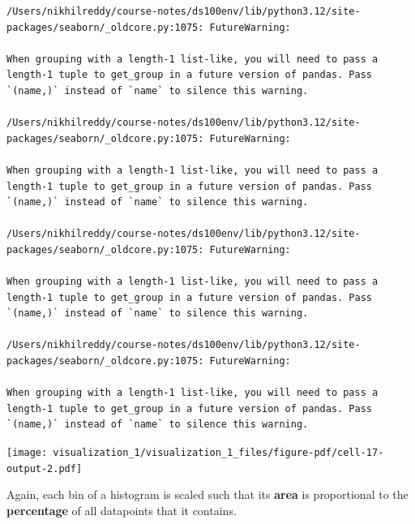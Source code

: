 \documentclass[
  letterpaper,
  DIV=11,
  numbers=noendperiod]{scrreprt}
\begin{document}
\begin{verbatim}
/Users/nikhilreddy/course-notes/ds100env/lib/python3.12/site-packages/seaborn/_oldcore.py:1075: FutureWarning:

When grouping with a length-1 list-like, you will need to pass a length-1 tuple to get_group in a future version of pandas. Pass `(name,)` instead of `name` to silence this warning.

/Users/nikhilreddy/course-notes/ds100env/lib/python3.12/site-packages/seaborn/_oldcore.py:1075: FutureWarning:

When grouping with a length-1 list-like, you will need to pass a length-1 tuple to get_group in a future version of pandas. Pass `(name,)` instead of `name` to silence this warning.

/Users/nikhilreddy/course-notes/ds100env/lib/python3.12/site-packages/seaborn/_oldcore.py:1075: FutureWarning:

When grouping with a length-1 list-like, you will need to pass a length-1 tuple to get_group in a future version of pandas. Pass `(name,)` instead of `name` to silence this warning.

/Users/nikhilreddy/course-notes/ds100env/lib/python3.12/site-packages/seaborn/_oldcore.py:1075: FutureWarning:

When grouping with a length-1 list-like, you will need to pass a length-1 tuple to get_group in a future version of pandas. Pass `(name,)` instead of `name` to silence this warning.
\end{verbatim}

\texttt{[image: visualization\_1/visualization\_1\_files/figure-pdf/cell-17-output-2.pdf]}

Again, each bin of a histogram is scaled such that its \textbf{area} is
proportional to the \textbf{percentage} of all datapoints that it
contains.
\end{document}
